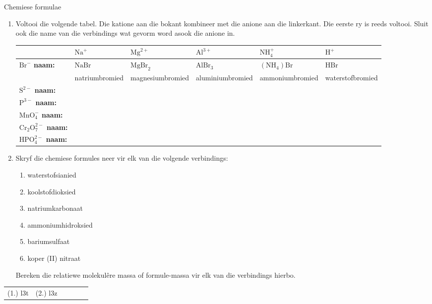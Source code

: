 \begin{exercises}{Chemiese formulae }
{
            \nopagebreak
        \label{m38689*id145052}\begin{enumerate}[noitemsep, label=\textbf{\arabic*}. ] 
            \label{m38689*uid100}\item 
Voltooi die volgende tabel. Die katione aan die bokant kombineer met die anione aan die linkerkant. Die eerste ry is reeds voltooi. Sluit ook die name van die verbindings wat gevorm word asook die anione in.
          \begin{table}[H]
        \begin{center}
      \label{m38689*id145067}
    \noindent
      \begin{tabular}{|p{1cm}|p{2.5cm}|p{2.5cm}|p{2.5cm}|p{2.5cm}|p{2.5cm}|}\hline
        &\textbf{ $\text{Na}^{+}$} & \textbf{$\text{Mg}^{2+}$} & \textbf{$\text{Al}^{3+}$} & \textbf{$\text{NH}_{4}^{+}$} & \textbf{$\text{H}^{+}$} \\ \hline
\multirow{2}{1cm}{\textbf{$\text{Br}^{-}$ naam:}} & $\text{NaBr}$  & $\text{MgBr}_2$  & $\text{AlBr}_3$  & $(\text{NH}_{4})\text{Br}$  & $\mathrm{HBr}$  \\ 
 & natriumbromied & magnesiumbromied & aluminiumbromied & ammoniumbromied & waterstofbromied \\ \hline
\textbf{$\text{S}^{2-}$ naam:} & & & & & \\ \hline
\textbf{$\text{P}^{3-}$ naam:} & & & & & \\ \hline
\textbf{$\text{MnO}_{4}^{-}$ naam:} & & & & & \\ \hline
\textbf{$\text{Cr}_{2}\text{O}_{7}^{2-}$ naam:} & & & & & \\ \hline
\textbf{$\text{HPO}_{4}^{2-}$ naam:} & & & & & \\ \hline
    \end{tabular}
      \end{center}
\end{table}
    \par
          \label{m38689*uid101}\item Skryf die chemiese formules neer vir elk van die volgende verbindings:
\label{m38689*id145444}\begin{enumerate}[noitemsep, label=\textbf{\alph*}. ] 
            \label{m38689*uid102}\item waterstofsianied
\label{m38689*uid103}\item koolstofdioksied
\label{m38689*uid104}\item natriumkarbonaat
\label{m38689*uid105}\item ammoniumhidroksied
\label{m38689*uid106}\item bariumsulfaat
\item koper (II) nitraat
\end{enumerate}
Bereken die relatiewe molekul\^{e}re massa of formule-massa vir elk van die verbindings hierbo.
                \end{enumerate}

\practiceinfo
\begin{tabular}[h]{cccccc}
 (1.) l3t  &  (2.) l3z  &
\end{tabular}
}
\end{exercises}
